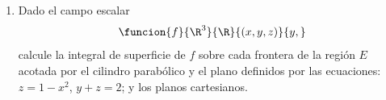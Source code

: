\documentclass[a4,11pt]{aleph-examen}
\begin{document}
\begin{preguntas}
\begin{respuesta}
\begin{respuesta}
\begin{respuesta}
\begin{enumerate}
\begin{respuesta}
    Entonces
	\[
        \iint_\alpha f dS=\iint_D f\l(\alpha (u,v) \r) \|N(u,v)\|dudv.
    \]
    Se calcula
	\[
        \begin{aligned}
            T_u(u,v)&=\dfrac{\partial \alpha}{\partial u}(u,v)=(\cos v,\sen v,0)\\
            T_v(u,v)&=\dfrac{\partial \alpha}{\partial v}(u,v)=(-u\sen v, u\cos v,0)
        \end{aligned}
    \]
    entonces
    \[
        \begin{aligned}
            \|N(u,v)\| &= \|(\cos v,\sen v,0)\times(-u\sen v, u\cos v,0)\| \\
            \|N(u,v)\| &= u.
        \end{aligned}
    \]
    Finalmente
    \[
        \begin{aligned}
            \iint_\alpha f dS&=\int_0^{2\pi} \int_0^3 \l(u \cos v + 4\r) u dudv\\
                &=36 \pi
        \end{aligned}
    \]
\end{respuesta}
\item 
    Dado el campo escalar
    \[
        \funcion{f}{\R^3}{\R}{(x,y,z)}{y,}
    \]
    calcule la integral de superficie de $f$ sobre cada frontera de la región $E$ acotada por el cilindro parabólico y el plano definidos por las ecuaciones: $z=1-x^2$, $y+z=2$; y los planos cartesianos.

\begin{center}
\end{center}


\end{enumerate}
\end{respuesta}
\end{respuesta}
\end{respuesta}
\end{preguntas}
\end{document}
